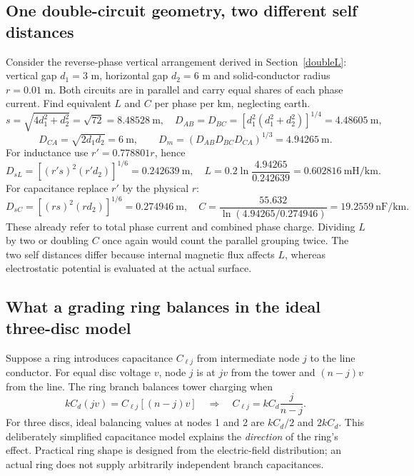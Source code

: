 \documentclass[11pt,a4paper]{article}
\newcommand{\ans}[1]{\boxed{#1}}
\begin{document}
\subsection{One double-circuit geometry, two different self distances}
Consider the reverse-phase vertical arrangement derived in Section~\ref{doubleL}: vertical gap $d_1=3$ m, horizontal gap $d_2=6$ m and solid-conductor radius $r=0.01$ m. Both circuits are in parallel and carry equal shares of each phase current. Find equivalent $L$ and $C$ per phase per km, neglecting earth.
\[
 s=\sqrt{4d_1^2+d_2^2}=\sqrt{72}=8.48528\ \mathrm m,\quad
 D_{AB}=D_{BC}=[d_1^2(d_1^2+d_2^2)]^{1/4}=4.48605\ \mathrm m,
\]
\[
 D_{CA}=\sqrt{2d_1d_2}=6\ \mathrm m,\qquad D_m=(D_{AB}D_{BC}D_{CA})^{1/3}=4.94265\ \mathrm m.
\]
For inductance use $r'=0.778801r$, hence
\[
 D_{sL}=[(r's)^2(r'd_2)]^{1/6}=0.242639\ \mathrm m,\quad
 L=0.2\ln\frac{4.94265}{0.242639}=\ans{0.602816\ \mathrm{mH/km}}.
\]
For capacitance replace $r'$ by the physical $r$:
\[
 D_{sC}=[(rs)^2(rd_2)]^{1/6}=0.274946\ \mathrm m,\quad
 C=\frac{55.632}{\ln(4.94265/0.274946)}=\ans{19.2559\ \mathrm{nF/km}}.
\]
These already refer to total phase current and combined phase charge. Dividing $L$ by two or doubling $C$ once again would count the parallel grouping twice. The two self distances differ because internal magnetic flux affects $L$, whereas electrostatic potential is evaluated at the actual surface.

\subsection{What a grading ring balances in the ideal three-disc model}
Suppose a ring introduces capacitance $C_{\ell j}$ from intermediate node $j$ to the line conductor. For equal disc voltage $v$, node $j$ is at $jv$ from the tower and $(n-j)v$ from the line. The ring branch balances tower charging when
\[
 kC_d(jv)=C_{\ell j}[(n-j)v]\quad\Rightarrow\quad
 C_{\ell j}=kC_d\frac{j}{n-j}.
\]
For three discs, ideal balancing values at nodes 1 and 2 are $kC_d/2$ and $2kC_d$. This deliberately simplified capacitance model explains the \emph{direction} of the ring's effect. Practical ring shape is designed from the electric-field distribution; an actual ring does not supply arbitrarily independent branch capacitances.


\end{document}
